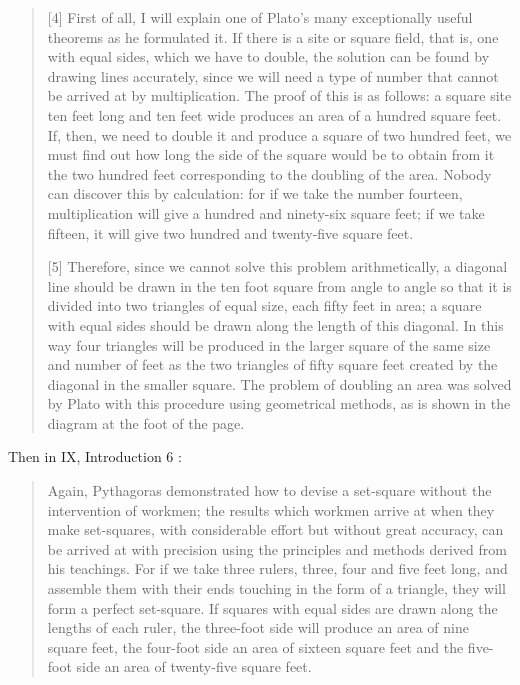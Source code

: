 \documentclass{amsart}
\theoremstyle{definition}
\begin{document}
\begin{quote}
[4] First of all, I will explain one of Plato's many exceptionally useful theorems as he formulated it. If there is a site
or square field, that is, one with equal sides, which we have to double, the solution can be found by drawing lines accurately,
since we will need a type of number that cannot be arrived at by multiplication. The proof of this is as follows: a square site
ten feet long and ten feet wide produces an area of a hundred square feet. If, then, we need to double it and produce a square
of two hundred feet, we must find out how long the side of the square would be to obtain from it the two hundred feet corresponding
to the doubling of the area. Nobody can discover this by calculation: for if we take the number fourteen, multiplication will give a 
hundred and ninety-six square feet; if we take fifteen, it will give two hundred and twenty-five square feet.

[5] Therefore, since we cannot solve this problem arithmetically, a diagonal line should be drawn in the ten foot square
from angle to angle so that it is divided into two triangles of equal size, each fifty feet in area; a square with equal sides
should be drawn along the length of this diagonal. In this way four triangles will be produced in the larger square of the same
size and number of feet as the two triangles of fifty square feet created by the diagonal in the smaller square. The problem of
doubling an area was solved by Plato with this procedure using geometrical methods, as is shown in the diagram at the foot
of the page.
\end{quote}

Then in IX, Introduction 6 \cite[pp.~243--244]{vitruvius}:

\begin{quote}
Again, Pythagoras demonstrated how to devise a set-square without the intervention of workmen; the results which workmen
arrive at when they make set-squares, with considerable effort but without great accuracy, can be arrived at with precision
using the principles and methods derived from his teachings. For if we take three rulers, three, four and five feet long,
and assemble them with their ends touching in the form of a triangle, they will form a perfect set-square. If squares with equal
sides are drawn along the lengths of each ruler, the three-foot side will produce an area of nine square feet, the four-foot
side an area of sixteen square feet and the five-foot side an area of twenty-five square feet.
\end{quote}
\end{document}
